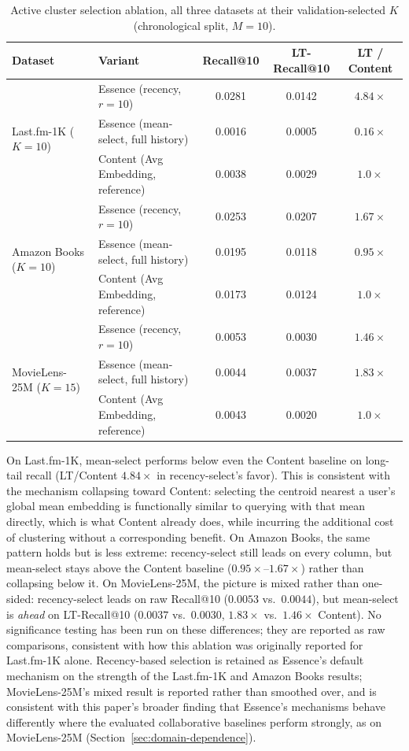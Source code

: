 \documentclass[11pt,a4paper]{article}
\begin{document}
\begin{table}[H]
\centering
\caption{Active cluster selection ablation, all three datasets at their
         validation-selected $K$ (chronological split, $M=10$).}
\label{tab:ablation}
\begin{tabular}{llccc}
\toprule
\textbf{Dataset} & \textbf{Variant} & \textbf{Recall@10} & \textbf{LT-Recall@10} & \textbf{LT / Content} \\
\midrule
\multirow{3}{*}{Last.fm-1K ($K=10$)}
  & Essence (recency, $r=10$)           & 0.0281 & 0.0142 & $4.84\times$ \\
  & Essence (mean-select, full history) & 0.0016 & 0.0005 & $0.16\times$ \\
  & Content (Avg Embedding, reference)  & 0.0038 & 0.0029 & $1.0\times$  \\
\midrule
\multirow{3}{*}{Amazon Books ($K=10$)}
  & Essence (recency, $r=10$)           & 0.0253 & 0.0207 & $1.67\times$ \\
  & Essence (mean-select, full history) & 0.0195 & 0.0118 & $0.95\times$ \\
  & Content (Avg Embedding, reference)  & 0.0173 & 0.0124 & $1.0\times$  \\
\midrule
\multirow{3}{*}{MovieLens-25M ($K=15$)}
  & Essence (recency, $r=10$)           & 0.0053 & 0.0030 & $1.46\times$ \\
  & Essence (mean-select, full history) & 0.0044 & 0.0037 & $1.83\times$ \\
  & Content (Avg Embedding, reference)  & 0.0043 & 0.0020 & $1.0\times$  \\
\bottomrule
\end{tabular}
\end{table}

On Last.fm-1K, mean-select performs below even the Content baseline on
long-tail recall (LT/Content $4.84\times$ in recency-select's favor).
This is consistent with the mechanism collapsing toward Content: selecting
the centroid nearest a user's global mean embedding is functionally similar
to querying with that mean directly, which is what Content already does,
while incurring the additional cost of clustering without a corresponding
benefit. On Amazon Books, the
same pattern holds but is less extreme: recency-select still leads on
every column, but mean-select stays above the Content baseline
($0.95\times$--$1.67\times$) rather than collapsing below it. On
MovieLens-25M, the picture is mixed rather than one-sided: recency-select
leads on raw Recall@10 ($0.0053$ vs.\ $0.0044$), but mean-select is
\emph{ahead} on LT-Recall@10 ($0.0037$ vs.\ $0.0030$, $1.83\times$ vs.\
$1.46\times$ Content). No significance testing has been run on these
differences; they are reported as raw comparisons, consistent with how
this ablation was originally reported for Last.fm-1K alone. Recency-based
selection is retained as Essence's default mechanism on the strength of
the Last.fm-1K and Amazon Books results; MovieLens-25M's mixed result is
reported rather than smoothed over, and is consistent with this paper's
broader finding that Essence's mechanisms behave differently where the
evaluated collaborative baselines perform strongly, as on MovieLens-25M
(Section~\ref{sec:domain-dependence}).
\end{document}
